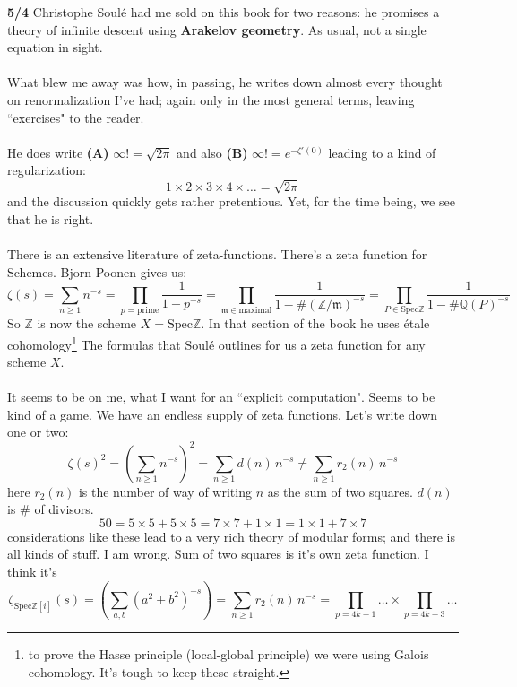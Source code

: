 \documentclass[12pt]{article}
\begin{document}
\newpage 

\noindent \textbf{5/4} Christophe Soul\'{e} had me sold on this book for two reasons:  he promises a theory of infinite descent using \textbf{Arakelov geometry}.  As usual, not a single equation in sight. \\ \\
What blew me away was how, in passing, he writes down almost every thought on renormalization I've had; again only in the most general terms, leaving ``exercises" to the reader. \\ \\
He does write \textbf{(A)} $\infty ! = \sqrt{2\pi}$ and also \textbf{(B)} $\infty! = e^{-\zeta'(0)} $ leading to a kind of regularization:
$$ 1 \times 2 \times 3 \times 4 \times \dots = \sqrt{2\pi} $$
and the discussion quickly gets rather pretentious.  Yet, for the time being, we see that he is right. \\ \\
There is an extensive literature of zeta-functions.  There's a zeta function for Schemes.  Bjorn Poonen gives us:
$$ \zeta(s) = \sum_{n \geq 1} n^{-s} = \prod_{p = \text{prime}} \frac{1}{1-p^{-s}} = 
\prod_{\mathfrak{m}\in \text{maximal}} \frac{1}{1- \# (\mathbb{Z}/\mathfrak{m})^{-s}} = \prod_{P \in \mathrm{Spec}\mathbb{Z}} \frac{1}{1-\# \mathbb{Q}(P)^{-s}}$$
So $\mathbb{Z}$ is now the scheme $X = \mathrm{Spec} \mathbb{Z}$. In that section of the book he uses \'{e}tale cohomology\footnote{to prove the Hasse principle (local-global principle) we were using Galois cohomology.  It's tough to keep these straight.} The formulas that Soul\'{e} outlines for us a zeta function for any scheme $X$. \\ \\
It seems to be on me, what I want for an ``explicit computation".  Seems to be kind of a game.  We have an endless supply of zeta functions.  Let's write down one or two:
$$ \zeta(s)^2 = \left( \sum_{n \geq 1} n^{-s} \right)^2 = \sum_{n \geq 1} d(n) \, n^{-s} \neq \sum_{n \geq 1} r_2(n) \, n^{-s}  $$
here $r_2(n)$ is the number of way of writing $n$ as the sum of two squares.  $d(n)$ is \# of divisors.
$$ 50 = 5 \times 5 + 5 \times 5 = 7 \times 7 + 1 \times 1 = 1 \times 1 + 7 \times 7 $$
considerations like these lead to a very rich theory of modular forms; and there is all kinds of stuff.  I am wrong.  Sum of two squares is it's own zeta function.  I think it's 
$$ \zeta_{\text{Spec}\mathbb{Z}[i]}(s) = \left( \sum_{a,b} (a^2+ b^2)^{-s} \right)  = \sum_{n \geq 1} r_2(n) \, n^{-s} = \prod_{p = 4k+1} \dots \times \prod_{p = 4k+3} \dots $$
\end{document}
